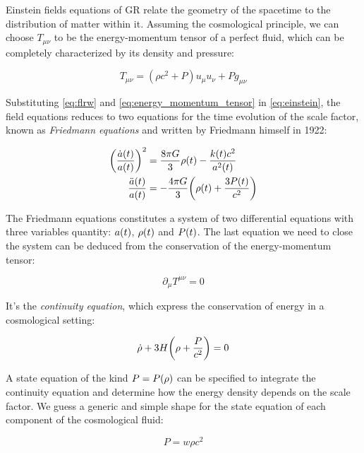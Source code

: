 Einstein fields equations of GR relate the geometry of the spacetime to the
distribution of matter within it. Assuming the cosmological principle, we
can choose $T_{\mu \nu}$ to be the energy-momentum tensor of a perfect
fluid, which can be completely characterized by its density and pressure:

\begin{equation}
         T_{\mu \nu} = (\rho c^2 + P)u_\mu u_\nu + P g_{\mu \nu}
         \label{eq:energy_momentum_tensor}
\end{equation}

Substituting \autoref{eq:flrw} and \autoref{eq:energy_momentum_tensor} in
\autoref{eq:einstein}, the field equations reduces to two equations for the
time evolution of the scale factor, known as \emph{Friedmann equations} and
written by Friedmann himself in 1922:

\begin{align}
        \qty(\frac{\dot a\qty(t)}{a\qty(t)})^2 & = \frac{8\pi G}{3} \rho\qty(t)
        - \frac{k\qty(t) c^2}{a^2\qty(t)}
        \label{eq:friedmann_1} \\
        \frac{\ddot a\qty(t)}{a\qty(t)} & = -\frac{4\pi G}{3}
        \qty(\rho\qty(t) + \frac{3 P\qty(t)}{c^2})
        \label{eq:friedmann_2}
\end{align}

The Friedmann equations constitutes a system of two differential equations
with three variables quantity: $a\qty(t)$, $\rho\qty(t)$ and $P\qty(t)$.
The last equation we need to close the system can be deduced from the
conservation of the energy-momentum tensor:

\begin{equation}
        \partial_\mu T^{\mu \nu} = 0
\end{equation}

It's the \emph{continuity equation}, which express the conservation of energy in a
cosmological setting:

\begin{equation}
        \dot \rho + 3 H \qty(\rho + \frac{P}{c^2}) = 0
        \label{eq:continuity}
\end{equation}

A state equation of the kind $P = P\qty(\rho)$ can be specified to
integrate the continuity equation and determine how the energy density
depends on the scale factor. We guess a generic and simple shape for the
state equation of each component of the cosmological fluid:

\begin{equation}
        P = w \rho c^2
        \label{eq:state}
\end{equation}

